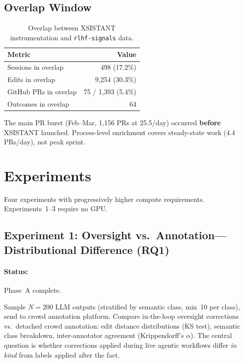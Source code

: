 \documentclass[11pt]{article}
\begin{document}
\subsection{Overlap Window}

\begin{table}[h]
\centering
\caption{Overlap between XSISTANT instrumentation and \texttt{rlhf-signals} data.}
\label{tab:overlap}
\begin{tabular}{@{}lr@{}}
\toprule
\textbf{Metric} & \textbf{Value} \\
\midrule
Sessions in overlap & 498 (17.2\%) \\
Edits in overlap    & 9{,}254 (30.3\%) \\
GitHub PRs in overlap & 75 / 1{,}393 (5.4\%) \\
Outcomes in overlap & 64 \\
\bottomrule
\end{tabular}
\end{table}

The main PR burst (Feb--Mar, 1{,}156 PRs at 25.5/day) occurred \textbf{before} XSISTANT launched.
Process-level enrichment covers steady-state work (4.4 PRs/day), not peak sprint.


\section{Experiments}
\label{sec:experiments}

Four experiments with progressively higher compute requirements.
Experiments~1--3 require no GPU.

\subsection{Experiment 1: Oversight vs.\ Annotation---Distributional Difference (RQ1)}
\label{sec:exp1}

\paragraph{Status:} Phase~A complete.

Sample $N=200$ LLM outputs (stratified by semantic class, min~10 per class), send to crowd annotation platform.
Compare in-the-loop oversight corrections vs.\ detached crowd annotation: edit distance distributions (KS test), semantic class breakdown, inter-annotator agreement (Krippendorff's $\alpha$).
The central question is whether corrections applied during live agentic workflows differ \emph{in kind} from labels applied after the fact.
\end{document}
